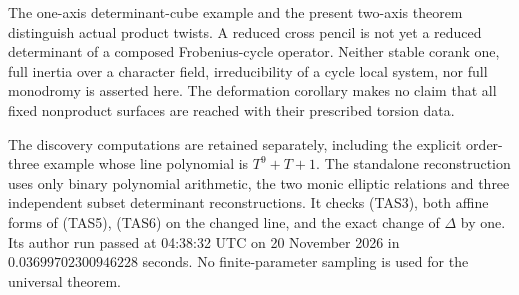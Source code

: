 \begin{remark}
\label{rem:ss-product-two-axis-squarefree-scope}
The one-axis determinant-cube example and the present two-axis
theorem distinguish actual product twists. A reduced cross pencil
is not yet a reduced determinant of a composed Frobenius-cycle
operator. Neither stable corank one, full inertia over a character
field, irreducibility of a cycle local system, nor full monodromy
is asserted here. The deformation corollary makes no claim that
all fixed nonproduct surfaces are reached with their prescribed
torsion data.

The discovery computations are retained separately, including the
explicit order-three example whose line polynomial is \(T^9+T+1\).
The standalone reconstruction
uses only binary polynomial arithmetic, the two monic elliptic
relations and three independent subset determinant reconstructions.
It checks (TAS3), both affine forms of (TAS5), (TAS6) on the
changed line, and the exact change of \(\Delta\) by one.
Its author run passed at 04:38:32 UTC on 20 November 2026 in
\(0.03699702300946228\) seconds. No finite-parameter sampling
is used for the universal theorem.
\end{remark}
